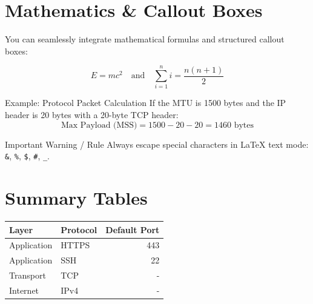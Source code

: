 
\section{Mathematics \& Callout Boxes}

You can seamlessly integrate mathematical formulas and structured callout boxes:

\begin{equation}
    E = mc^2 \quad \text{and} \quad \sum_{i=1}^{n} i = \frac{n(n+1)}{2}
\end{equation}

\begin{examplebox}{Example: Protocol Packet Calculation}
If the MTU is 1500 bytes and the IP header is 20 bytes with a 20-byte TCP header:
\begin{equation*}
    \text{Max Payload (MSS)} = 1500 - 20 - 20 = 1460\text{ bytes}
\end{equation*}
\end{examplebox}

\begin{warningbox}{Important Warning / Rule}
Always escape special characters in LaTeX text mode: \texttt{\&}, \texttt{\%}, \texttt{\$}, \texttt{\#}, \texttt{\_}.
\end{warningbox}

\section{Summary Tables}

\begin{center}
\begin{tabular}{llr}
\toprule
\textbf{Layer} & \textbf{Protocol} & \textbf{Default Port} \\
\midrule
Application & HTTPS & 443 \\
Application & SSH   & 22  \\
Transport   & TCP   & -   \\
Internet    & IPv4  & -   \\
\bottomrule
\end{tabular}
\end{center}
